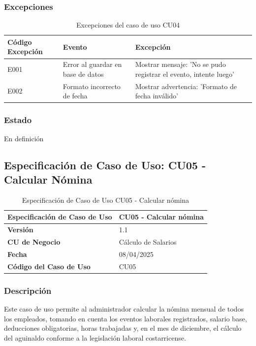 \subsubsection*{Excepciones}
\begin{table}[h]
	\centering
	\caption{Excepciones del caso de uso CU04}
	\begin{tabular}{|p{3cm}|p{5cm}|p{5cm}|}
		\hline
		\textbf{Código Excepción} & \textbf{Evento}                   & \textbf{Excepción}                                               \\ \hline
		E001                      & Error al guardar en base de datos & Mostrar mensaje: 'No se pudo registrar el evento, intente luego' \\ \hline
		E002                      & Formato incorrecto de fecha       & Mostrar advertencia: 'Formato de fecha inválido'                 \\ \hline
	\end{tabular}
\end{table}

\newpage

\subsubsection*{Estado}
En definición

\subsection*{Especificación de Caso de Uso: CU05 - Calcular Nómina}

\begin{table}[h]
	\centering
	\caption{Especificación de Caso de Uso CU05 - Calcular nómina}
	\begin{tabular}{|p{5cm}|p{9cm}|}
		\hline
		\textbf{Especificación de Caso de Uso} & CU05 - Calcular nómina \\ \hline
		\textbf{Versión}                       & 1.1                    \\ \hline
		\textbf{CU de Negocio}                 & Cálculo de Salarios    \\ \hline
		\textbf{Fecha}                         & 08/04/2025             \\ \hline
		\textbf{Código del Caso de Uso}        & CU05                   \\ \hline
	\end{tabular}
\end{table}

\subsubsection*{Descripción}
Este caso de uso permite al administrador calcular la nómina mensual de todos los empleados, tomando en cuenta los eventos laborales registrados, salario base, deducciones obligatorias, horas trabajadas y, en el mes de diciembre, el cálculo del aguinaldo conforme a la legislación laboral costarricense.

